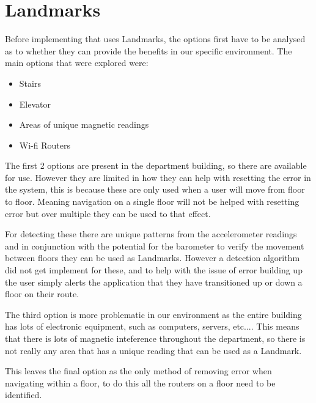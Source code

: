 \documentclass[main.tex]{subfiles}
\begin{document}
\section{Landmarks}

Before implementing that uses Landmarks, the options first have to be analysed as to whether they can provide the benefits in our specific environment. The main options that were explored were:

\begin{itemize}
	\item Stairs
	\item Elevator
	\item Areas of unique magnetic readings
	\item Wi-fi Routers
\end{itemize}

The first 2 options are present in the department building, so there are available for use. However they are limited in how they can help with resetting the error in the system, this is because these are only used when a user will move from floor to floor. Meaning navigation on a single floor will not be helped with resetting error but over multiple they can be used to that effect. 

For detecting these there are unique patterns from the accelerometer readings and in conjunction with the potential for the barometer to verify the movement between floors they can be used as Landmarks. However a detection algorithm did not get implement for these, and to help with the issue of error building up the user simply alerts the application that they have transitioned up or down a floor on their route.

The third option is more problematic in our environment as the entire building has lots of electronic equipment, such as computers, servers, etc.... This means that there is lots of magnetic inteference throughout the department, so there is not really any area that has a unique reading that can be used as a Landmark.

This leaves the final option as the only method of removing error when navigating within a floor, to do this all the routers on a floor need to be identified.
\end{document}
